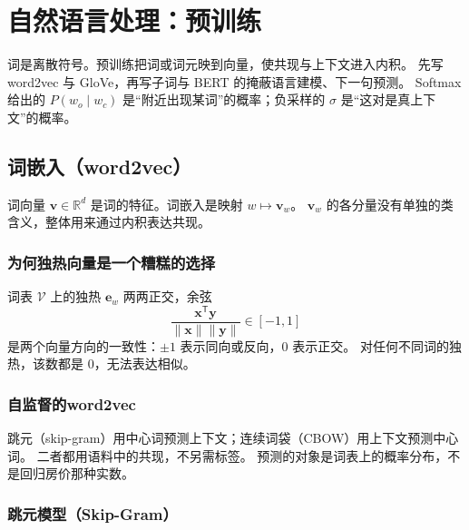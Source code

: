 \chapter{自然语言处理：预训练}

词是离散符号。预训练把词或词元映到向量，使共现与上下文进入内积。
先写 word2vec 与 GloVe，再写子词与 BERT 的掩蔽语言建模、下一句预测。
Softmax 给出的 $P(w_o\mid w_c)$ 是“附近出现某词”的概率；负采样的 $\sigma$ 是“这对是真上下文”的概率。

\section{词嵌入（word2vec）}




词向量 $\bm{v}\in\mathbb{R}^{d}$ 是词的特征。词嵌入是映射 $w\mapsto\bm{v}_w$。
$\bm{v}_w$ 的各分量没有单独的类含义，整体用来通过内积表达共现。

\subsection{为何独热向量是一个糟糕的选择}

词表 $\mathcal{V}$ 上的独热 $\bm{e}_w$ 两两正交，余弦
\[
\frac{\bm{x}^{\mathsf T}\bm{y}}{\|\bm{x}\|\|\bm{y}\|}\in[-1,1]
\]
是两个向量方向的一致性：$\pm 1$ 表示同向或反向，$0$ 表示正交。
对任何不同词的独热，该数都是 $0$，无法表达相似。

\subsection{自监督的word2vec}

跳元（skip-gram）用中心词预测上下文；连续词袋（CBOW）用上下文预测中心词。
二者都用语料中的共现，不另需标签。
预测的对象是词表上的概率分布，不是回归房价那种实数。

\subsection{跳元模型（Skip-Gram）}

